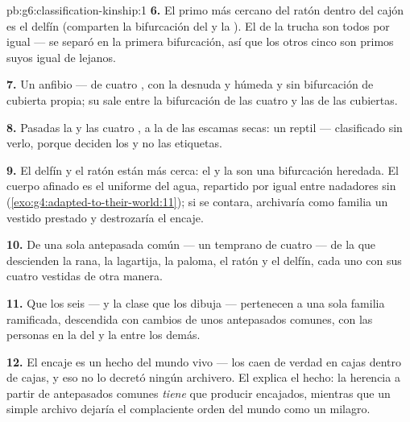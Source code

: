 \begin{solution}{pb:g6:classification-kinship:1}
\textbf{6.} El primo más cercano del ratón dentro del cajón es el
delfín (comparten la bifurcación del  y la ). El de la trucha
son todos por igual --- se separó en la primera bifurcación, así que
los otros cinco son primos suyos igual de lejanos.

\textbf{7.} Un anfibio --- de cuatro , con la  desnuda
y húmeda y sin bifurcación de cubierta propia; su  sale entre la
bifurcación de las cuatro  y las de las cubiertas.

\textbf{8.} Pasadas la  y las cuatro , a
la  de las escamas secas: un reptil --- clasificado sin verlo,
porque deciden los  y no las etiquetas.

\textbf{9.} El delfín y el ratón están más cerca: el  y la 
son una bifurcación heredada. El cuerpo afinado es el uniforme del
agua, repartido por igual entre nadadores sin 
(\cref{exo:g4:adapted-to-their-world:11}); si se contara, archivaría
como familia un vestido prestado y destrozaría el encaje.

\textbf{10.} De una sola  antepasada común --- un 
temprano de cuatro  --- de la que descienden la rana, la
lagartija, la paloma, el ratón y el delfín, cada uno con sus cuatro
 vestidas de otra manera.

\textbf{11.} Que los seis --- y la clase que los dibuja ---
pertenecen a una sola familia ramificada, descendida con cambios de
unos antepasados comunes, con las personas en la  del  y la
 entre los demás.

\textbf{12.} El encaje es un hecho del mundo vivo --- los 
caen de verdad en cajas dentro de cajas, y eso no lo decretó ningún
archivero. El  explica el hecho: la herencia a partir de
antepasados comunes \emph{tiene} que producir  encajados,
mientras que un simple archivo dejaría el complaciente orden del mundo
como un milagro.
\end{solution}
